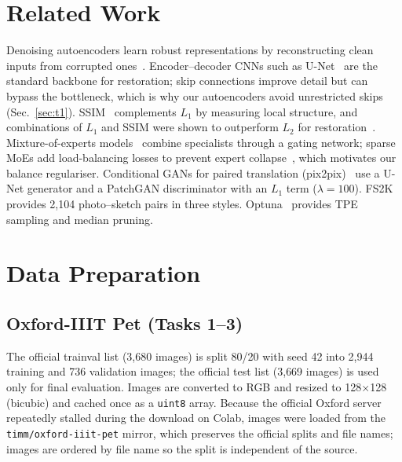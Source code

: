 \documentclass[conference]{IEEEtran}
\begin{document}
\section{Related Work}
Denoising autoencoders learn robust representations by reconstructing clean inputs from corrupted ones~\cite{vincent2008}. Encoder--decoder CNNs such as U-Net~\cite{unet} are the standard backbone for restoration; skip connections improve detail but can bypass the bottleneck, which is why our autoencoders avoid unrestricted skips (Sec.~\ref{sec:t1}). SSIM~\cite{ssim} complements $L_1$ by measuring local structure, and combinations of $L_1$ and SSIM were shown to outperform $L_2$ for restoration~\cite{zhao2017}. Mixture-of-experts models~\cite{jacobs1991} combine specialists through a gating network; sparse MoEs add load-balancing losses to prevent expert collapse~\cite{shazeer2017,switch}, which motivates our balance regulariser. Conditional GANs for paired translation (pix2pix)~\cite{pix2pix} use a U-Net generator and a PatchGAN discriminator with an $L_1$ term ($\lambda=100$). FS2K~\cite{fs2k} provides 2{,}104 photo--sketch pairs in three styles. Optuna~\cite{optuna} provides TPE sampling and median pruning.

\section{Data Preparation}
\subsection{Oxford-IIIT Pet (Tasks 1--3)}
The official trainval list (3{,}680 images) is split 80/20 with seed 42 into 2{,}944 training and 736 validation images; the official test list (3{,}669 images) is used only for final evaluation. Images are converted to RGB and resized to 128$\times$128 (bicubic) and cached once as a \texttt{uint8} array. Because the official Oxford server repeatedly stalled during the download on Colab, images were loaded from the \texttt{timm/oxford-iiit-pet} mirror, which preserves the official splits and file names; images are ordered by file name so the split is independent of the source.
\end{document}
